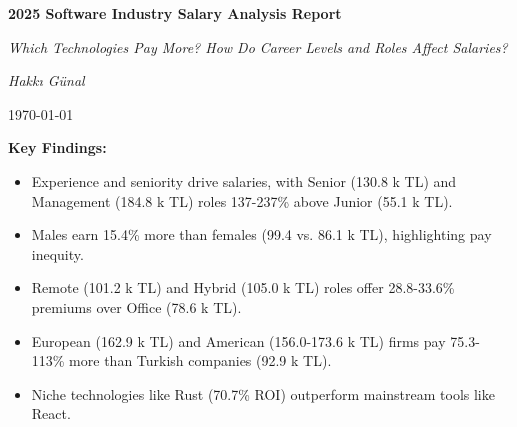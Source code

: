 \documentclass[12pt,a4paper]{article}
\begin{document}
\thispagestyle{empty}

\begin{titlepage}
    \centering
    \vfill
    \vspace*{1.5cm}
    \vspace{1cm}
    {\Huge \bfseries \color{titleblue} 2025 Software Industry Salary Analysis Report\par}
    \vspace{0.5cm}
    {\Large \itshape \color{darkgray} Which Technologies Pay More? How Do Career Levels and Roles Affect Salaries?\par}
    \vspace{1cm}
    {\Large \itshape Hakkı Günal\par}
    \vspace{0.5cm}
    {\large \today\par}
    \vspace{1cm}
    {\normalsize
        \begin{minipage}{0.8\textwidth}
            \centering
            \color{darkgray}
            \textbf{Key Findings:}
            \begin{itemize}
                \item Experience and seniority drive salaries, with Senior (130.8 k TL) and Management (184.8 k TL) roles 137-237\% above Junior (55.1 k TL).
                \item Males earn 15.4\% more than females (99.4 vs. 86.1 k TL), highlighting pay inequity.
                \item Remote (101.2 k TL) and Hybrid (105.0 k TL) roles offer 28.8-33.6\% premiums over Office (78.6 k TL).
                \item European (162.9 k TL) and American (156.0-173.6 k TL) firms pay 75.3-113\% more than Turkish companies (92.9 k TL).
                \item Niche technologies like Rust (70.7\% ROI) outperform mainstream tools like React.
            \end{itemize}

\end{minipage}}
\end{titlepage}
\end{document}
